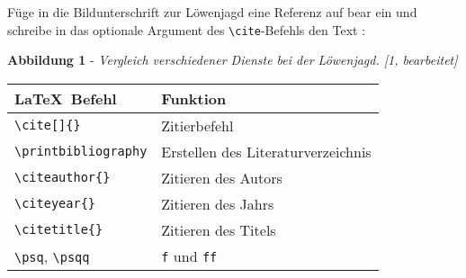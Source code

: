 \begin{frame}[fragile]
	\begin{Aufgabe}
		Füge in die Bildunterschrift zur Löwenjagd eine Referenz auf \textrm{bear} ein und schreibe in das optionale Argument des \lstinline[basicstyle=\normalfont\normalsize]|\cite|-Befehls den Text \textrm{}:
	\end{Aufgabe}
	\begin{outputbox}
		\vspace{-0.3cm}
		\begin{center}
			\textbf{Abbildung 1} - \textit{Vergleich verschiedener Dienste bei der Löwenjagd. [1, bearbeitet]}
		\end{center}
		\vspace{-0.3cm}
	\end{outputbox}
	\btVFill\Befehle
	\begin{center}
		\begin{tabular}{ll}
			\toprule
			\LaTeX\ Befehl							&	Funktion					\\ \midrule
			\lstinline|\cite[]{}|					&	Zitierbefehl\\
			\lstinline|\printbibliography|			&	Erstellen des Literaturverzeichnis\\
			\lstinline|\citeauthor{}|				&	Zitieren des Autors \\
			\lstinline|\citeyear{}|					&	Zitieren des Jahrs \\
			\lstinline|\citetitle{}|				&	Zitieren des Titels \\
			\lstinline|\psq|, \lstinline|\psqq|		&	\texttt{f} und \texttt{ff} \\
			\bottomrule
		\end{tabular}
	\end{center}
	\vspace{0.1cm}
\end{frame}
